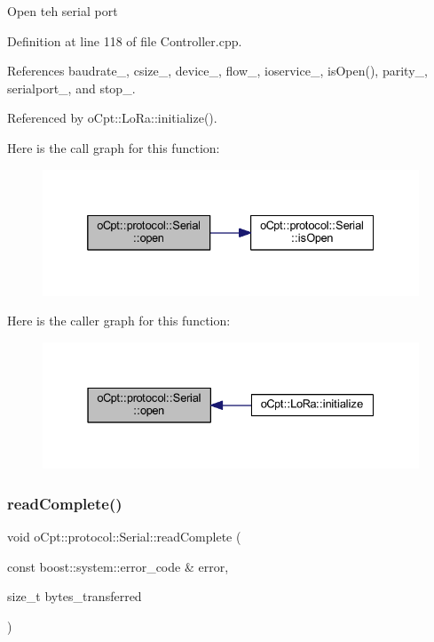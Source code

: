 Open teh serial port 

Definition at line 118 of file Controller.\+cpp.



References baudrate\+\_\+, csize\+\_\+, device\+\_\+, flow\+\_\+, ioservice\+\_\+, is\+Open(), parity\+\_\+, serialport\+\_\+, and stop\+\_\+.



Referenced by o\+Cpt\+::\+Lo\+Ra\+::initialize().

Here is the call graph for this function\+:\nopagebreak
\begin{figure}[H]
\begin{center}
\leavevmode
\includegraphics[width=332pt]{classo_cpt_1_1protocol_1_1_serial_a7738b1566f37b36c97055a8800482a10_cgraph}
\end{center}
\end{figure}
Here is the caller graph for this function\+:\nopagebreak
\begin{figure}[H]
\begin{center}
\leavevmode
\includegraphics[width=331pt]{classo_cpt_1_1protocol_1_1_serial_a7738b1566f37b36c97055a8800482a10_icgraph}
\end{center}
\end{figure}
\hypertarget{classo_cpt_1_1protocol_1_1_serial_ac7d84ba0853d120852157c490bdcd097}{}\label{classo_cpt_1_1protocol_1_1_serial_ac7d84ba0853d120852157c490bdcd097} 
\subsubsection{\texorpdfstring{read\+Complete()}{readComplete()}}
{\footnotesize\ttfamily void o\+Cpt\+::protocol\+::\+Serial\+::read\+Complete (\begin{DoxyParamCaption}\item[{const boost\+::system\+::error\+\_\+code \&}]{error,  }\item[{size\+\_\+t}]{bytes\+\_\+transferred }\end{DoxyParamCaption})\hspace{0.3cm}{\ttfamily [protected]}}

